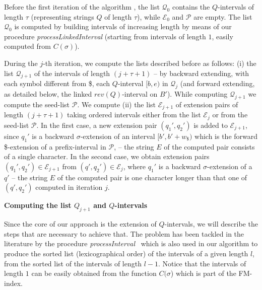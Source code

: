 \documentclass[runningheads,envcountsame,a4paper]{llncs}
\begin{document}




Before the first iteration of the algorithm , the list $\mathcal{Q}_0$ contains the
$Q$-intervals of length $\tau$ (representing strings $Q$ of length $\tau$), while  $\mathcal{E}_0$ and $\mathcal{P}$ are empty.
The list $\mathcal{Q}_0$ is computed  by building intervals of increasing length by means of our procedure \emph{processLinkedInterval} (starting from intervals of length $1$, easily computed from $C(\sigma)$).



During the $j$-th iteration, we compute the lists described before as follows:
(i) the list $\mathcal{Q}_{j+1}$ of the
intervals of length $(j+\tau+1)$  -- by backward extending, with each symbol different from \$, each $Q$-interval $[b, e)$ in $\mathcal{Q}_{j}$ (and forward extending, as detailed  below, the
linked $rev(Q)$-interval on $B'$). While computing $\mathcal{Q}_{j+1}$ we compute the seed-list $\mathcal{P}$.
We compute
(ii) the list $\mathcal{E}_{j+1}$ of
extension pairs of length $(j+\tau+1)$  taking ordered intervals   either from the  list   $\mathcal{E}_{j}$ or from the seed-list $\mathcal{P}$.    In the first case, a new  extension pair
$(q_{1}',q_{2}')$ is added to $\mathcal{E}_{j+1}$, since   $q_{1}'$ is a backward $\sigma$-extension
of an interval $[b',b'+w_\$)$ which is the forward \$-extension of a prefix-interval in $\mathcal{P}$,  -- the string $E$ of the computed pair consists of a single character. In the second case,
we obtain  extension pairs $(q_{1}',q_{2}') \in \mathcal{E}_{j+1}$  from $(q',q_{2}')\in \mathcal{E}_{j}$, where
$q_{1}'$ is a backward $\sigma$-extension
of a $q'$   -- the string $E$ of the computed pair is one
character longer than that one of $(q', q_{2}')$ computed in iteration $j$.


\noindent
{\bf  Computing  the list $Q_{j+1} $ and $Q$-intervals}

Since the core of our approach is the extension of $Q$-intervals, we will
describe the steps that are necessary to achieve that.
The problem has been tackled in the literature by
the procedure \emph{processInterval}~\cite{Cox2012} which is also used in our algorithm to produce the sorted list
(lexicographical order) of the intervals of a given length $l$, from the
sorted list of the intervals of length $l-1$. Notice that the intervals of length $1$
can be easily obtained from the  function $C(\sigma$) which is part of the FM-index.
\end{document}
